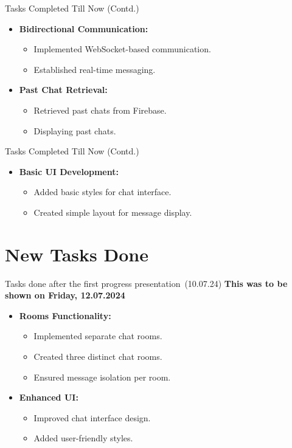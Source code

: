 \documentclass{beamer}
\begin{document}
\begin{frame}{Tasks Completed Till Now (Contd.)}
    \begin{itemize}
        \item \textbf{Bidirectional Communication:}
        \begin{itemize}
            \item Implemented WebSocket-based communication.
            \item Established real-time messaging.
        \end{itemize}
        \item \textbf{Past Chat Retrieval:}
        \begin{itemize}
            \item Retrieved past chats from Firebase.
            \item Displaying past chats.
        \end{itemize}
    \end{itemize}
\end{frame}

\begin{frame}{Tasks Completed Till Now (Contd.)}
    \begin{itemize}
        \item \textbf{Basic UI Development:}
        \begin{itemize}
            \item Added basic styles for chat interface.
            \item Created simple layout for message display.
        \end{itemize}
    \end{itemize}
\end{frame}

\section{New Tasks Done}

\begin{frame}{Tasks done after the first progress presentation (10.07.24)}
    \textbf{This was to be shown on Friday, 12.07.2024}
    \begin{itemize}
        \item \textbf{Rooms Functionality:}
        \begin{itemize}
            \item Implemented separate chat rooms.
            \item Created three distinct chat rooms.
            \item Ensured message isolation per room.
        \end{itemize}
        \item \textbf{Enhanced UI:}
        \begin{itemize}
            \item Improved chat interface design.
            \item Added user-friendly styles.
        \end{itemize}
    \end{itemize}
\end{frame}
\end{document}

